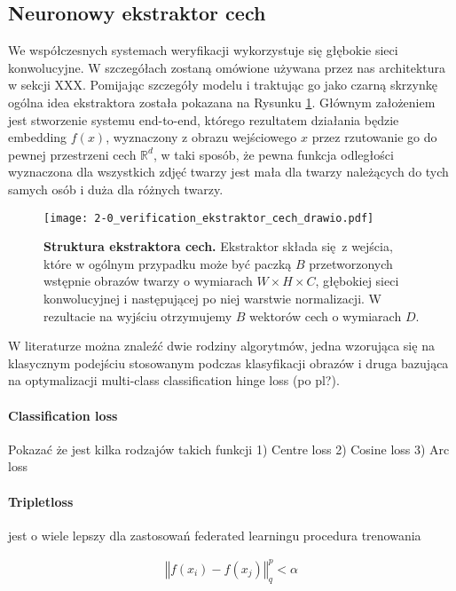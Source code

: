 \subsection{Neuronowy ekstraktor cech} \label{sec:ekstraktor}
We współczesnych systemach weryfikacji wykorzystuje się głębokie sieci konwolucyjne. W
szczegółach zostaną omówione używana przez nas architektura w sekcji XXX. Pomijając szczegóły
modelu i traktując go jako czarną skrzynkę ogólna idea ekstraktora została pokazana na Rysunku
\ref{fig:ekstraktor_cech}. Głównym założeniem jest stworzenie systemu end-to-end, którego
rezultatem działania będzie embedding \(f(x)\), wyznaczony z obrazu wejściowego \(x\) przez
rzutowanie go do pewnej przestrzeni cech \(\mathbb{R}^d\), w taki sposób, że pewna funkcja
odległości wyznaczona dla wszystkich zdjęć twarzy jest mała dla twarzy należących do tych samych
osób i duża dla różnych twarzy. 

\begin{figure}[h]
    \centering
    \texttt{[image: 2-0\_verification\_ekstraktor\_cech\_drawio.pdf]}
    \caption{\textbf{Struktura ekstraktora cech.} Ekstraktor składa się z wejścia, które w ogólnym przypadku może być paczką \(B\) przetworzonych wstępnie obrazów twarzy o wymiarach \( W \times H \times C\), głębokiej sieci konwolucyjnej i następującej po niej warstwie normalizacji. W rezultacie na wyjściu otrzymujemy \(B\) wektorów cech o wymiarach \(D\).}
    \label{fig:ekstraktor_cech}
\end{figure}





W literaturze można znaleźć dwie rodziny algorytmów, jedna wzorująca się na klasycznym podejściu
stosowanym podczas klasyfikacji obrazów i druga bazująca na optymalizacji multi-class
classification hinge loss (po pl?).


\paragraph{Classification loss}
Pokazać że jest kilka rodzajów takich funkcji
1) Centre loss
2) Cosine loss
3) Arc loss

\paragraph{Tripletloss}
jest o wiele lepszy dla zastosowań federated learningu
procedura trenowania

\begin{align}\label{eq:triplet_dystant}
    \left\Vert f(x_i) - f(x_j) \right\Vert_q^p < \alpha
\end{align}



